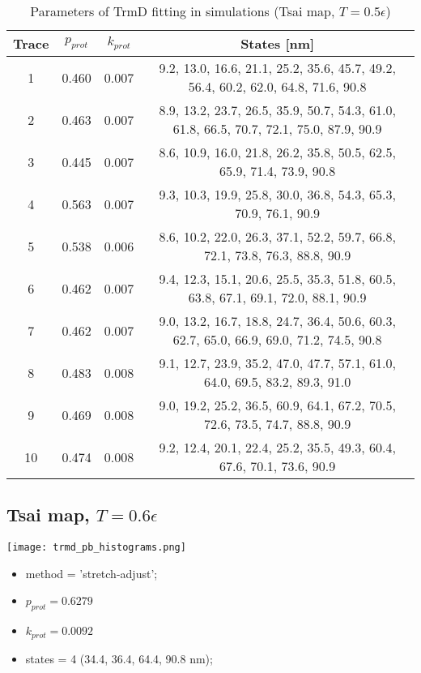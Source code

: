 \begin{table}
    \tiny
    \centering
    \caption{Parameters of TrmD fitting in simulations (Tsai map, $T=0.5\epsilon$)}
    \label{tab:trmd-pa-parameters}
    \begin{tabular}{c|c|c|c}
        \textbf{Trace} & \textbf{$p_{prot}$} & \textbf{$k_{prot}$} & \textbf{States [nm]}\\\hline
        1 & 0.460 & 0.007 & 9.2, 13.0, 16.6, 21.1, 25.2, 35.6, 45.7, 49.2, 56.4, 60.2, 62.0, 64.8, 71.6, 90.8\\
        2 & 0.463 & 0.007 & 8.9, 13.2, 23.7, 26.5, 35.9, 50.7, 54.3, 61.0, 61.8, 66.5, 70.7, 72.1, 75.0, 87.9, 90.9\\
        3 & 0.445 & 0.007 & 8.6, 10.9, 16.0, 21.8, 26.2, 35.8, 50.5, 62.5, 65.9, 71.4, 73.9, 90.8\\
        4 & 0.563 & 0.007 & 9.3, 10.3, 19.9, 25.8, 30.0, 36.8, 54.3, 65.3, 70.9, 76.1, 90.9\\
        5 & 0.538 & 0.006 & 8.6, 10.2, 22.0, 26.3, 37.1, 52.2, 59.7, 66.8, 72.1, 73.8, 76.3, 88.8, 90.9\\
        6 & 0.462 & 0.007 & 9.4, 12.3, 15.1, 20.6, 25.5, 35.3, 51.8, 60.5, 63.8, 67.1, 69.1, 72.0, 88.1, 90.9\\
        7 & 0.462 & 0.007 & 9.0, 13.2, 16.7, 18.8, 24.7, 36.4, 50.6, 60.3, 62.7, 65.0, 66.9, 69.0, 71.2, 74.5, 90.8\\
        8 & 0.483 & 0.008 & 9.1, 12.7, 23.9, 35.2, 47.0, 47.7, 57.1, 61.0, 64.0, 69.5, 83.2, 89.3, 91.0\\
        9 & 0.469 & 0.008 & 9.0, 19.2, 25.2, 36.5, 60.9, 64.1, 67.2, 70.5, 72.6, 73.5, 74.7, 88.8, 90.9\\
        10 & 0.474 & 0.008 & 9.2, 12.4, 20.1, 22.4, 25.2, 35.5, 49.3, 60.4, 67.6, 70.1, 73.6, 90.9\\\hline
    \end{tabular}
\end{table}

\subsection{Tsai map, $T=0.6\epsilon$}
\label{subsec:trmd-pb}
\begin{minipage}[c]{0.7\textwidth}
    \texttt{[image: trmd\_pb\_histograms.png]}
\end{minipage}
\hfill
\begin{minipage}[c]{0.45\textwidth}
    \begin{itemize}
        \item method = 'stretch-adjust';
        \item $p_{prot}=0.6279$
        \item $k_{prot}=0.0092$
        \item states = 4 (34.4, 36.4, 64.4, 90.8 nm);
    \end{itemize}
\end{minipage}

